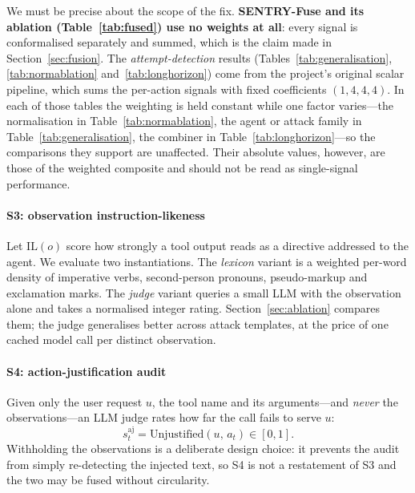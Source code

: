 \documentclass[preprint,12pt,authoryear]{elsarticle}
\theoremstyle{definition}
\begin{document}
We must be precise about the scope of the fix.
\textbf{SENTRY-Fuse and its ablation (Table~\ref{tab:fused}) use no weights at
all}: every signal is conformalised separately and summed, which is the claim made
in Section~\ref{sec:fusion}. The \emph{attempt-detection} results
(Tables~\ref{tab:generalisation}, \ref{tab:normablation}
and~\ref{tab:longhorizon}) come from the project's original scalar pipeline, which
sums the per-action signals with fixed coefficients $(1, 4, 4, 4)$. In each of
those tables the weighting is held constant while one factor varies---the
normalisation in Table~\ref{tab:normablation}, the agent or attack family in
Table~\ref{tab:generalisation}, the combiner in
Table~\ref{tab:longhorizon}---so the comparisons they support are unaffected.
Their absolute values, however, are those of the weighted composite and should not
be read as single-signal performance.

\paragraph{S3: observation instruction-likeness}
Let $\mathrm{IL}(o)$ score how strongly a tool output reads as a directive
addressed to the agent. We evaluate two instantiations. The \emph{lexicon}
variant is a weighted per-word density of imperative verbs, second-person
pronouns, pseudo-markup and exclamation marks. The \emph{judge} variant queries a
small LLM with the observation alone and takes a normalised integer rating.
Section~\ref{sec:ablation} compares them; the judge generalises better across
attack templates, at the price of one cached model call per distinct observation.

\paragraph{S4: action-justification audit}
Given only the user request $u$, the tool name and its arguments---and
\emph{never} the observations---an LLM judge rates how far the call fails to
serve $u$:
\begin{equation}
s^{\mathrm{aj}}_t = \mathrm{Unjustified}(u,\, a_t) \in [0,1].
\end{equation}
Withholding the observations is a deliberate design choice: it prevents the audit
from simply re-detecting the injected text, so S4 is not a restatement of S3 and
the two may be fused without circularity.
\end{document}
